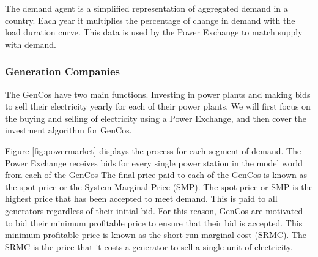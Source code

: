 The demand agent is a simplified representation of aggregated demand in a country. Each year it multiplies the percentage of change in demand with the load duration curve. This data is used by the Power Exchange to match supply with demand.

\subsubsection{Generation Companies} The GenCos have two main functions. Investing in power plants and making bids to sell their electricity yearly for each of their power plants. We will first focus on the buying and selling of electricity using a Power Exchange, and then cover the investment algorithm for GenCos.

Figure \ref{fig:powermarket} displays the process for each segment of demand. The Power Exchange receives bids for every single power station in the model world from each of the GenCos The final price paid to each of the GenCos is known as the spot price or the System Marginal Price (SMP). The spot price or SMP is the highest price that has been accepted to meet demand. This is paid to all generators regardless of their initial bid. For this reason, GenCos are motivated to bid their minimum profitable price to ensure that their bid is accepted. This minimum profitable price is known as the short run marginal cost (SRMC). The SRMC is the price that it costs a generator to sell a single unit of electricity. 

 

